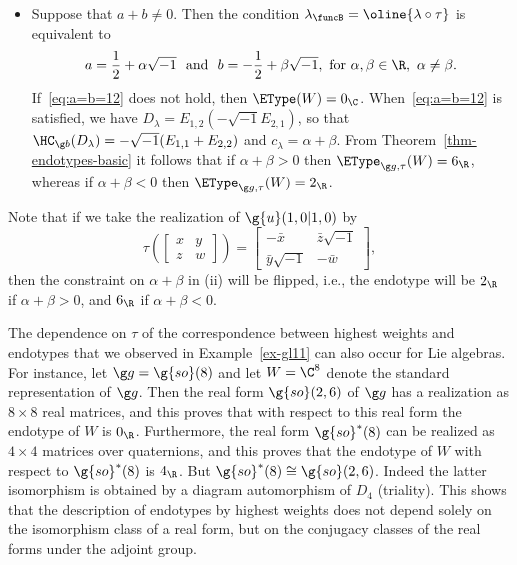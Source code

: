 \documentclass[12pt]{amsart}
\begin{document}
\begin{ex}
\begin{itemize}
\item[(ii)] Suppose that $a+b\neq 0$. Then the condition $\lambda_\funcB=\oline{\lambda\circ\tau}$ is equivalent to
\begin{equation}
\label{eq:a=b=12}
a=\frac12+\alpha\sqrt{-1}\ \text{ and }\ 
b=-\frac12+\beta\sqrt{-1},\text{ for }\alpha,\beta\in\R,\ \alpha\neq \beta. 
\end{equation}
If~\eqref{eq:a=b=12} does not hold, then $\EType(W)=0_\C$. 
When~\eqref{eq:a=b=12} is satisfied, we have $D_\lambda=
E_{1,2}(-\sqrt{-1}E_{2,1})$, so that $\HC_{\g b}(D_\lambda)=-\sqrt{-1}(E_{1,1}+E_{2,2})$ and $c_\lambda=\alpha+\beta$. From Theorem~\ref{thm-endotypes-basic} it follows that if $\alpha+\beta>0$ then $\EType_{\g g,\tau}(W)=6_\R$, whereas if 
$\alpha+\beta<0$ then $\EType_{\g g,\tau}(W)=2_\R$. 
\end{itemize}
Note that if we take the realization of $\g{u}(1,0|1,0)$ 
by\[
\tau\left(\begin{bmatrix}
x & y\\z& w
\end{bmatrix}
\right)=
\begin{bmatrix}
-\bar x & \bar z\sqrt{-1}\\\bar y\sqrt{-1}& -\bar w
\end{bmatrix}
,\]
then the constraint on $\alpha+\beta$ in (ii) will be flipped, i.e., the endotype will be $2_\R$ if $\alpha+\beta>0$, and $6_\R$ if $\alpha+\beta<0$. 


\end{ex}

\begin{rmk}
The dependence on $\tau$ of the correspondence between highest weights and endotypes that we observed in Example~\ref{ex-gl11}  can also occur for Lie algebras. For instance, let $\g g=\g{so}(8)$ and let $W=\C^8$ denote the standard representation of $\g g$.  Then the real form $\g{so}(2,6)$ of $\g g$  has a realization as $8\times 8$ real matrices, and this proves that 
with respect to this real form the endotype of $W$ is $0_\R$. Furthermore,  the real form $\g{so}^*(8)$ can be realized as $4\times 4$ matrices over quaternions, and this proves that the endotype of $W$ with respect to  $\g{so}^*(8)$ is $4_\R$. But $\g{so}^*(8)\cong \g{so}(2,6)$. Indeed the latter isomorphism is obtained by a diagram automorphism of $D_4$ (triality). 
This shows that the description of endotypes by highest weights does not depend solely on the isomorphism class of a real form, but on the conjugacy classes of the real forms under the adjoint group. 
\end{rmk}
\end{document}
